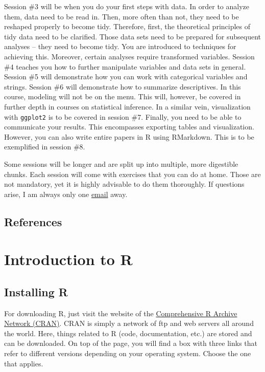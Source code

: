 \documentclass[
]{book}
\begin{document}
Session \#3 will be when you do your first steps with data. In order to analyze them, data need to be read in. Then, more often than not, they need to be reshaped properly to become tidy. Therefore, first, the theoretical principles of tidy data need to be clarified. Those data sets need to be prepared for subsequent analyses -- they need to become tidy. You are introduced to techniques for achieving this. Moreover, certain analyses require transformed variables. Session \#4 teaches you how to further manipulate variables and data sets in general. Session \#5 will demonstrate how you can work with categorical variables and strings. Session \#6 will demonstrate how to summarize descriptives. In this course, modeling will not be on the menu. This will, however, be covered in further depth in courses on statistical inference. In a similar vein, visualization with \texttt{ggplot2} is to be covered in session \#7. Finally, you need to be able to communicate your results. This encompasses exporting tables and visualization. However, you can also write entire papers in R using RMarkdown. This is to be exemplified in session \#8.

Some sessions will be longer and are split up into multiple, more digestible chunks. Each session will come with exercises that you can do at home. Those are not mandatory, yet it is highly advisable to do them thoroughly. If questions arise, I am always only one \href{mailto:\%20FE.4970@emp.hhs.se}{email} away.

\hypertarget{references}{%
\section{References}\label{references}}

\hypertarget{intro_R}{%
\chapter{Introduction to R}\label{intro_R}}

\hypertarget{installing-r}{%
\section{Installing R}\label{installing-r}}

For downloading R, just visit the website of the \href{https://cran.r-project.org}{Comprehensive R Archive Network (CRAN)}. CRAN is simply a network of ftp and web servers all around the world. Here, things related to R (code, documentation, etc.) are stored and can be downloaded.
On top of the page, you will find a box with three links that refer to different versions depending on your operating system. Choose the one that applies.
\end{document}
